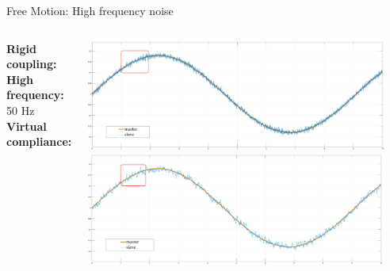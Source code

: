 \documentclass[10pt]{beamer}
\begin{document}
\begin{frame}{Free Motion: High frequency noise}
  \smallskip
  \begin{columns}
    \color{Orange}\textbf{Rigid coupling:}\\
    \bigskip
    \bigskip
    \bigskip
    \color{black}\textbf{High frequency:} 50 Hz\\
    \bigskip
    \bigskip
    \bigskip
    \color{LightBlue}\textbf{Virtual compliance:}\\

 
   \includegraphics[width=\textwidth,
    height=0.45\textwidth]{../reportTeleop/Images/rCoupFreeTot50htznoiseRect}\\
    \smallskip
    \includegraphics[width=\textwidth,
    height=0.45\textwidth]{../reportTeleop/Images/set20freeTot50HtznoiseRect}
    \end{columns}
  
\end{frame}
\end{document}

